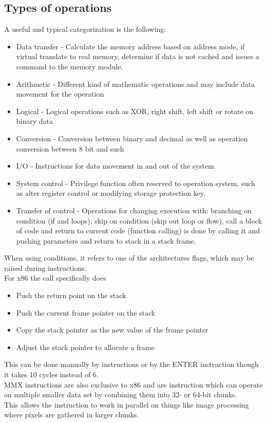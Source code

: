 \documentclass[12pt, a4paper]{article}
\begin{document}
		\subsection{Types of operations}
			A useful and typical categorization is the following: 
			\begin{itemize}
				\item Data transfer - Calculate the memory address based on address mode, if virtual translate to real memory, determine if data is not cached and issues a command to the memory module.
				\item Arithmetic - Different kind of mathematic operations and may include data movement for the operation
				\item Logical - Logical operations such as XOR, right shift, left shift or rotate on binary data
				\item Conversion - Conversion between binary and decimal as well as operation conversion between 8 bit and such
				\item I/O - Instructions for data movement in and out of the system
				\item System control - Privilege function often reserved to operation system, such as alter register control or modifying storage protection key.
				\item Transfer of control - Operations for changing execution with: branching on condition (if and loops), skip on condition (skip out loop or flow), call a block of code and return to current code (function calling) is done by calling it and pushing parameters and return to stack in a stack frame. 
			\end{itemize}
			When using conditions, it refers to one of the architectures flags, which may be raised during instructions.\\
			For x86 the call specifically does
			\begin{itemize}
				\item Push the return point on the stack
				\item Push the current frame pointer on the stack
				\item Copy the stack pointer as the new value of the frame pointer
				\item Adjust the stack pointer to allocate a frame
			\end{itemize}
			This can be done manually by instructions or by the ENTER instruction though it takes 10 cycles instead of 6.\\
			MMX instructions are also exclusive to x86 and are instruction which can operate on multiple smaller data set by combining them into 32- or 64-bit chunks.\\
			This allows the instruction to work in parallel on things like image processing where pixels are gathered in larger chunks.\\
\end{document}
